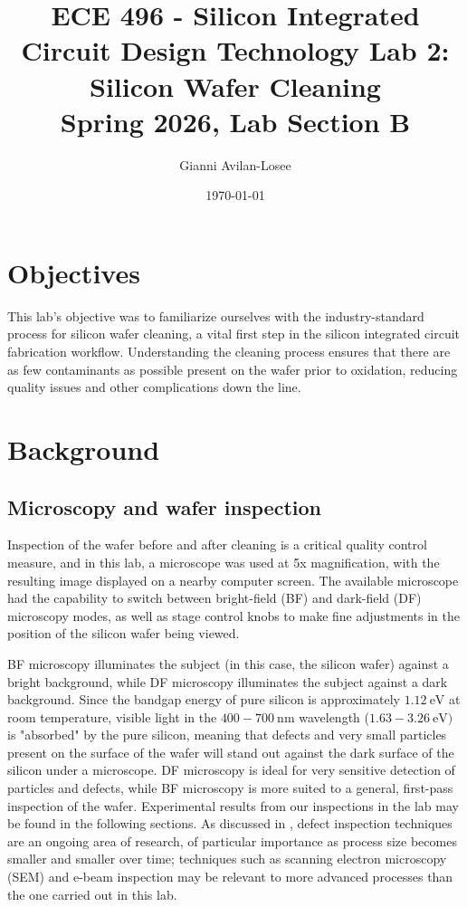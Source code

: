 \documentclass[12pt]{report}
\title{ECE 496 - Silicon Integrated Circuit Design Technology  Lab 2: Silicon Wafer Cleaning \\ Spring 2026, Lab Section B}
\author{Gianni Avilan-Losee}
\date{\today}
\begin{document}
\maketitle
\setcounter{chapter}{2}
\setcounter{section}{0}
\section{Objectives}

This lab's objective was to familiarize ourselves with the industry-standard process for silicon wafer cleaning, a vital first step in the silicon integrated circuit fabrication workflow. Understanding the cleaning process ensures that there are as few contaminants as possible present on the wafer prior to oxidation, reducing quality issues and other complications down the line.

\section{Background}

\subsection{Microscopy and wafer inspection}

Inspection of the wafer before and after cleaning is a critical quality control measure, and in this lab, a microscope was used at 5x magnification, with the resulting image displayed on a nearby computer screen. The available microscope had the capability to switch between bright-field (BF) and dark-field (DF) microscopy modes, as well as stage control knobs to make fine adjustments in the position of the silicon wafer being viewed. 

BF microscopy illuminates the subject (in this case, the silicon wafer) against a bright background, while DF microscopy illuminates the subject against a dark background. Since the bandgap energy of pure silicon is approximately \(1.12 \ \mathrm{eV}\) at room temperature, visible light in the \(400-700 \ \mathrm{nm}\) wavelength (\(1.63-3.26 \ \mathrm{eV})\) is "absorbed" by the pure silicon, meaning that defects and very small particles present on the surface of the wafer will stand out against the dark surface of the silicon under a microscope. DF microscopy is ideal for very sensitive detection of particles and defects, while BF microscopy is more suited to a general, first-pass inspection of the wafer. Experimental results from our inspections in the lab may be found in the following sections. As discussed in \cite{inspection}, defect inspection techniques are an ongoing area of research, of particular importance as process size becomes smaller and smaller over time; techniques such as scanning electron microscopy (SEM) and e-beam inspection may be relevant to more advanced processes than the one carried out in this lab.
\end{document}
